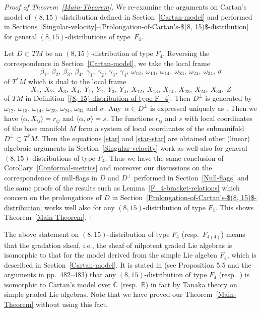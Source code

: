 \documentclass[pdftex]{sigma}
\numberwithin{equation}{section}
\theoremstyle{definition}
\newcommand{\R}{\mathbb{R}}
\newcommand{\C}{\mathbb{C}}
\newcommand{\0}{\boldsymbol{0}}
\begin{document}
\begin{proof}[Proof of Theorem~\ref{Main-Theorem}]
We re-examine the arguments on Cartan's model of $(8, 15)$-dis\-tri\-bu\-tion
defined in Section~\ref{Cartan-model} and performed in Sections~\ref{Singular-velocity}--\ref{Prolongation-of-Cartan's-$(8, 15)$-distribution} for general $(8, 15)$-dis\-tri\-bu\-tions of type~$F_4$.

Let $D \subset TM$ be an $(8, 15)$-distribution of type $F_4$.
Reversing the correspondence in Section~\ref{Cartan-model},
we take the local frame
\[
\beta_1,\ \beta_2,\ \beta_3,\ \beta_4,\ \gamma_1,\ \gamma_2,\ \gamma_3,\ \gamma_4,\ \omega_{12},\ \omega_{13},\
\omega_{14},\ \omega_{23},\ \omega_{24},\ \omega_{34},\ \sigma
\]
of $T^*M$ which is dual to the local frame
\[
X_1,\ X_2,\ X_3,\ X_4,\ Y_1,\ Y_2,\ Y_3,\ Y_4,\ X_{12},\ X_{13},\ X_{14},\ X_{23},\ X_{24},\ X_{34},\ Z
\]
of $TM$ in Definition~\ref{(8, 15)-distribution-of-type-F_4}. Then $D^\perp$ is
generated by $\omega_{12}$,
$\omega_{13}$, $\omega_{14}$, $\omega_{23}$, $\omega_{24}$, $\omega_{34}$ and $\sigma$.
Any~$\alpha \in D^\perp$ is expressed uniquely as
. Then
we have $\langle \alpha, X_{ij}\rangle = r_{ij}$ and $\langle \alpha, \sigma\rangle = s$.
The functions $r_{ij}$ and $s$ with local coordinates of the base manifold
$M$ form a system of local coordinates of the submanifold $D^\perp \subset T^*M$.
Then the equations \eqref{star} and \eqref{star-star} are obtained
other (linear) algebraic arguments in Section~\ref{Singular-velocity} work as well
also for general $(8, 15)$-distributions of type $F_4$. Thus we have
the same conclusion of Corollary~\ref{Conformal-metrics} and moreover our discussions
on the correspondence of null-flags in $D$ and $D^\perp$
performed in Section~\ref{Null-flags} and the same proofs
of the results such as Lemma~\ref{F_4-bracket-relations}
which concern on the prolongations of $D$ in Section~\ref{Prolongation-of-Cartan's-$(8, 15)$-distribution}
works well also for any $(8, 15)$-distribution of type $F_4$. This shows Theorem~\ref{Main-Theorem}.
\end{proof}

\begin{Remark}
The above statement on $(8, 15)$-distribution of type $F_4$ (resp.\ $F_{4(4)}$) means that
the gradation sheaf, i.e.,
the sheaf of nilpotent graded Lie algebras
is isomorphic to that for the model derived from
the simple Lie algebra $F_4$, which is described in Section~\ref{Cartan-model}.
It is stated in \cite{Yamaguchi} (see Proposition 5.5 and the arguments in pp.~482--483)
that any $(8, 15)$-distribution of type $F_4$ (resp.\ \smash{$F_{4(4)}$}) is isomorphic to Cartan's model over $\C$ (resp.\ $\R$)
in fact by Tanaka theory on simple graded Lie algebras.
Note that we have proved our Theorem~\ref{Main-Theorem} without using this fact.
\end{Remark}
\end{document}
